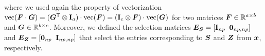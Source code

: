 \documentclass[journal, onecolumn]{IEEEtran}
\begin{document}
where we used again the property of vectorization $\text{vec}({\bm F} \cdot {\bm G}) =  ({\bm G}^{\mathsf{T}} \otimes {\mathbf I}_a) \cdot \text{vec}({\bm F}) = 
({\mathbf I}_c \otimes {\bm F}) \cdot \text{vec}({\bm G})$ for two matrices ${\bm F} \in { {\mathbb R}^{a \times b} }$ and ${\bm G} \in { {\mathbb R}^{b \times c} }$.
Moreover, we defined the selection matrices ${\bm E}_{\bm S} = [{\mathbf I}_{np} \;\; {\mathbf 0}_{np,np}]$ and ${\bm E}_{\bm Z} = [{\mathbf 0}_{np} \;\; {\mathbf I}_{np,np}]$ that select the entries corresponding to ${\bm S}$ and ${\bm Z}$ from ${\bm x}$, respectively.



\end{document}
